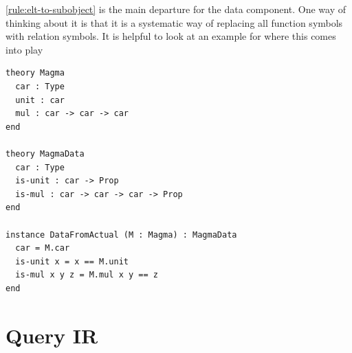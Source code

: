 \documentclass{article}
\begin{document}

\cref{rule:elt-to-subobject} is the main departure for the data component. One way of thinking about it is that it is a systematic way of replacing all function symbols with relation symbols. It is helpful to look at an example for where this comes into play

\begin{verbatim}
theory Magma
  car : Type
  unit : car
  mul : car -> car -> car
end

theory MagmaData
  car : Type
  is-unit : car -> Prop
  is-mul : car -> car -> car -> Prop
end

instance DataFromActual (M : Magma) : MagmaData
  car = M.car
  is-unit x = x == M.unit
  is-mul x y z = M.mul x y == z
end
\end{verbatim}

\section{Query IR}
\end{document}
